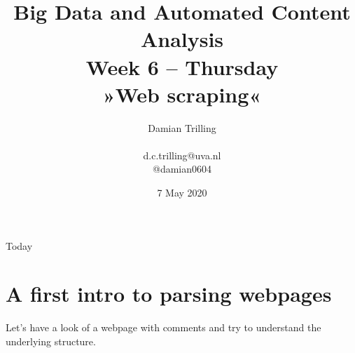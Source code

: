 \documentclass{beamer}
\begin{document}
	

\title[Big Data  and Automated Content Analysis]{\textbf{Big Data  and Automated Content Analysis} \\ Week 6 -- Thursday\\ »Web scraping«}
\author{Damian Trilling \\ ~ \\ \footnotesize{d.c.trilling@uva.nl \\@damian0604} \\ }
\date{7 May 2020}

\begin{frame}{}
\titlepage
\end{frame}

\begin{frame}{Today}
\tableofcontents
\end{frame}


\section{A first intro to parsing webpages}

\begin{frame}
Let's have a look of a webpage with comments and try to understand the underlying structure.
\end{frame}


{
\begin{frame}[plain]
\end{frame}
\begin{frame}[plain]
\end{frame}

\begin{frame}[plain]
\end{frame}
}
\end{document}
